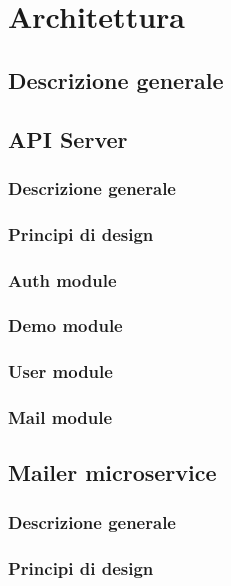 \chapter{Architettura}
\section{Descrizione generale}

\section{API Server}
\subsection{Descrizione generale}

\subsection{Principi di design}

\subsection{Auth module}

\subsection{Demo module}

\subsection{User module}

\subsection{Mail module}


\section{Mailer microservice}
\subsection{Descrizione generale}

\subsection{Principi di design}

